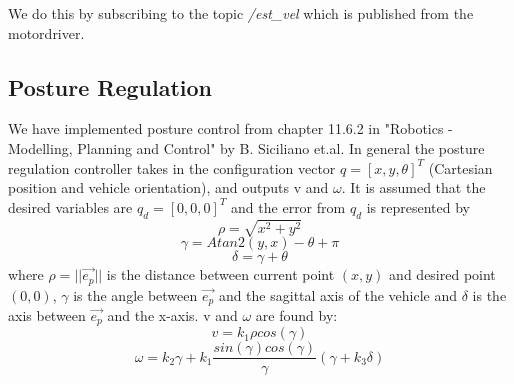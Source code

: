 \documentclass[a4paper,10pt]{article}
\begin{document}
		We do this by subscribing to the topic \textit{/est\_vel} which is published from the motordriver.

		
\subsection{Posture Regulation}

	
		We have implemented posture control from chapter 11.6.2 in  "Robotics - Modelling, Planning and Control" by B. Siciliano et.al. 
		In general the posture regulation controller takes in the configuration vector $q = [x, y, \theta]^{T}$ (Cartesian position and vehicle orientation), 
		and outputs v and $\omega$.
		It is assumed that the desired variables are $q_{d} = [0, 0, 0]^{T}$ and the error from $q_{d}$ is represented by
		\begin{equation}
			\rho = \sqrt{x^{2} + y^{2}} 
		\end{equation}
		\begin{equation}
			\gamma = Atan2(y, x) - \theta + \pi
		\end{equation}
		\begin{equation}
			\delta = \gamma + \theta
		\end{equation}
		where $\rho = ||\vec{e_{p}}||$ is the distance between current point $(x, y)$ and desired point $(0, 0)$, 
		$\gamma$ is the angle between $\vec{e_{p}}$	and the sagittal axis of the vehicle and $\delta$ is the axis between $\vec{e_{p}}$ and the x-axis.	
		v and $\omega$ are found by:
		\begin{equation}
			v = k_{1}\rho cos(\gamma)
		\end{equation}		
		\begin{equation}
			\omega = k_{2}\gamma + k_{1}\frac{sin(\gamma)cos(\gamma)}{\gamma}(\gamma + k_{3}\delta)
		\end{equation}
		
\end{document}
